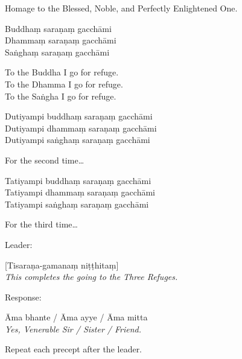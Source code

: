 \begin{english}
  Homage to the Blessed, Noble, and Perfectly Enlightened One.
\end{english}

Buddhaṃ saraṇaṃ gacchāmi\\
Dhammaṃ saraṇaṃ gacchāmi\\
Saṅghaṃ saraṇaṃ gacchāmi

\begin{english}
  To the Buddha I go for refuge.\\
  To the Dhamma I go for refuge.\\
  To the Saṅgha I go for refuge.
\end{english}

Dutiyampi buddhaṃ saraṇaṃ gacchāmi\\
Dutiyampi dhammaṃ saraṇaṃ gacchāmi\\
Dutiyampi saṅghaṃ saraṇaṃ gacchāmi

\begin{english}
  For the second time\ldots
\end{english}

Tatiyampi buddhaṃ saraṇaṃ gacchāmi\\
Tatiyampi dhammaṃ saraṇaṃ gacchāmi\\
Tatiyampi saṅghaṃ saraṇaṃ gacchāmi

\begin{english}
  For the third time\ldots
\end{english}

\begin{instruction}
  Leader:
\end{instruction}

[Tisaraṇa-gamanaṃ niṭṭhitaṃ]\\
\emph{This completes the going to the Three Refuges.}

\begin{instruction}
  Response:
\end{instruction}

Āma bhante / Āma ayye / Āma mitta\\
\emph{Yes, Venerable Sir / Sister / Friend.}

\begin{instruction}
  Repeat each precept after the leader.
\end{instruction}

\ifhandbookedition
\enlargethispage{-\baselineskip}
\fi

